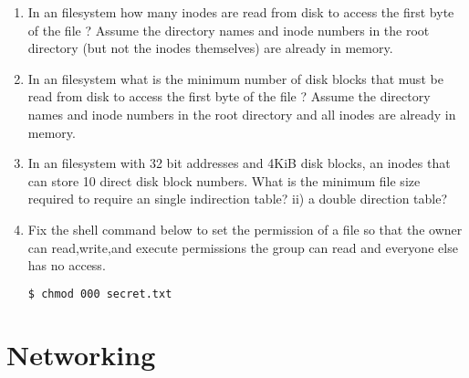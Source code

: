 \begin{enumerate}

\item In an  filesystem how many inodes are read from disk to access the first byte of the file  ? Assume the directory names and inode numbers in the root directory (but not the inodes themselves) are already in memory.

\item In an  filesystem what is the minimum number of disk blocks that must be read from disk to access the first byte of the file  ? Assume the directory names and inode numbers in the root directory and all inodes are already in memory.

\item In an  filesystem with 32 bit addresses and 4KiB disk blocks, an inodes that can store 10 direct disk block numbers. What is the minimum file size required to require an single indirection table? ii) a double direction table?

\item Fix the shell command  below to set the permission of a file  so that the owner can read,write,and execute permissions the group can read and everyone else has no access.

\begin{lstlisting}[language=bash]
$ chmod 000 secret.txt
\end{lstlisting}

\end{enumerate}

\section{Networking}

